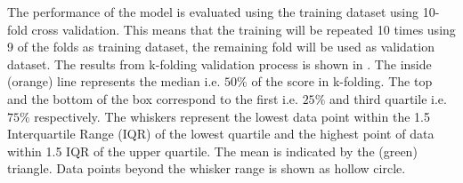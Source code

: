 The performance of the model is evaluated using the training dataset using 10-fold cross validation. This means that the training will be repeated 10 times using 9 of the folds as training dataset, the remaining fold will be used as validation dataset. The results from k-folding validation process is shown in . The inside (orange) line represents the median i.e. $50\%$ of the score in k-folding. The top and the bottom of the box correspond to the first i.e. $25\%$ and third quartile i.e. $75\%$ respectively. The whiskers represent the lowest data point within the 1.5 Interquartile Range (IQR) of the lowest quartile and the highest point of data within 1.5 IQR of the upper quartile. The mean is indicated by the (green) triangle. Data points beyond the whisker range is shown as hollow circle.\\
